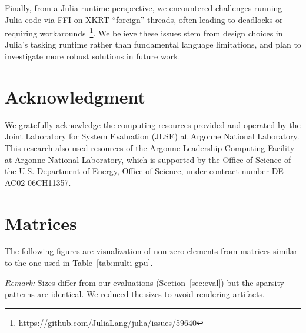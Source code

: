 \documentclass{juliacon}
\begin{document}
Finally, from a Julia runtime perspective, we encountered challenges running Julia code via FFI on XKRT “foreign” threads, often leading to deadlocks or requiring workarounds~\footnote{\url{https://github.com/JuliaLang/julia/issues/59640}}.  
We believe these issues stem from design choices in Julia’s tasking runtime rather than fundamental language limitations, and plan to investigate more robust solutions in future work.


\section{Acknowledgment} \label{sec:ack}
We gratefully acknowledge the computing resources provided and operated by the Joint Laboratory for System Evaluation (JLSE) at Argonne National Laboratory.
This research also used resources of the Argonne Leadership Computing Facility at Argonne National Laboratory, which is supported by the Office of Science of the U.S. Department of Energy, Office of Science, under contract number DE-AC02-06CH11357.




\appendix

\section{Matrices} \label{sec:appendix-matrices}

The following figures are visualization of non-zero elements from matrices similar to the one used in Table~\ref{tab:multi-gpu}.

\emph{Remark:} Sizes differ from our evaluations (Section~\ref{sec:eval}) but the sparsity patterns are identical.
We reduced the sizes to avoid rendering artifacts.
\end{document}
